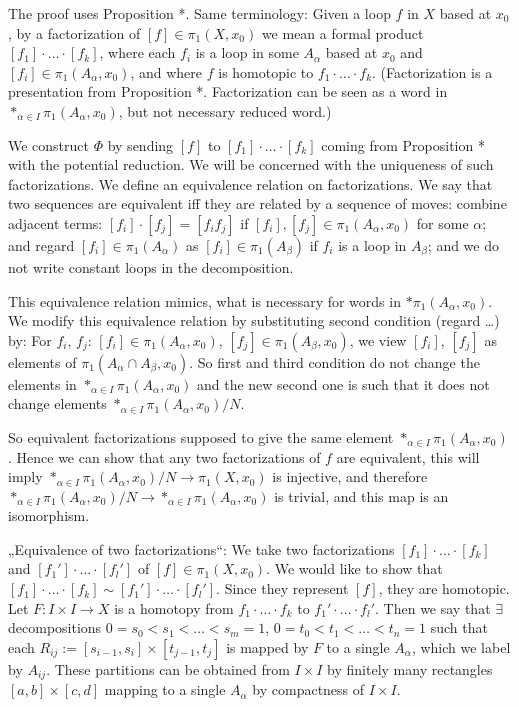 \documentclass[12pt]{article}					%
\begin{document}
	\begin{dukaz}
		The proof uses Proposition *. Same terminology: Given a loop $f$ in $X$ based at $x_0$, by a factorization of $[f] \in π_1(X, x_0)$ we mean a formal product $[f_1]·…·[f_k]$, where each $f_i$ is a loop in some $A_α$ based at $x_0$ and $[f_i] \in π_1(A_α, x_0)$, and where $f$ is homotopic to $f_1·…·f_k$. (Factorization is a presentation from Proposition *. Factorization can be seen as a word in $*_{α \in I} π_1(A_α, x_0)$, but not necessary reduced word.)

		We construct $Φ$ by sending $[f]$ to $[f_1]·…·[f_k]$ coming from Proposition * with the potential reduction. We will be concerned with the uniqueness of such factorizations. We define an equivalence relation on factorizations. We say that two sequences are equivalent iff they are related by a sequence of moves: combine adjacent terms: $[f_i]·[f_j] = [f_if_j]$ if $[f_i], [f_j] \in π_1(A_α, x_0)$ for some $α$; and regard $[f_i] \in π_1(A_α)$ as $[f_i] \in π_1(A_β)$ if $f_i$ is a loop in $A_β$; and we do not write constant loops in the decomposition.

		This equivalence relation mimics, what is necessary for words in $* π_1(A_α, x_0)$. We modify this equivalence relation by substituting second condition (regard …) by: For $f_i$, $f_j$: $[f_i] \in π_1(A_α, x_0)$, $[f_j] \in π_1(A_β, x_0)$, we view $[f_i]$, $[f_j]$ as elements of $π_1(A_α \cap A_β, x_0)$. So first and third condition do not change the elements in $*_{α \in I} π_1(A_α, x_0)$ and the new second one is such that it does not change elements $*_{α \in I} π_1(A_α, x_0) / N$.

		So equivalent factorizations supposed to give the same element $*_{α \in I} π_1(A_α, x_0)$. Hence we can show that any two factorizations of $f$ are equivalent, this will imply $*_{α \in I} π_1(A_α, x_0) / N \rightarrow π_1(X, x_0)$ is injective, and therefore $*_{α \in I} π_1(A_α, x_0) / N \rightarrow *_{α \in I} π_1(A_α, x_0)$ is trivial, and this map is an isomorphism.

		„Equivalence of two factorizations“: We take two factorizations $[f_1]·…·[f_k]$ and $[f_1']·…·[f_l']$ of $[f] \in π_1(X, x_0)$. We would like to show that $[f_1]·…·[f_k] \sim [f_1']·…·[f_l']$. Since they represent $[f]$, they are homotopic. Let $F: I \times I \rightarrow X$ is a homotopy from $f_1·…·f_k$ to $f_1'·…·f_l'$. Then we say that $\exists$ decompositions $0 = s_0 < s_1 < … < s_m = 1$, $0 = t_0 < t_1 < … < t_n = 1$ such that each $R_{ij} := [s_{i-1}, s_i] \times [t_{j-1}, t_j]$ is mapped by $F$ to a single $A_α$, which we label by $A_{ij}$. These partitions can be obtained from $I \times I$ by finitely many rectangles $[a, b] \times [c, d]$ mapping to a single $A_α$ by compactness of $I \times I$.


\end{dukaz}
\end{document}
